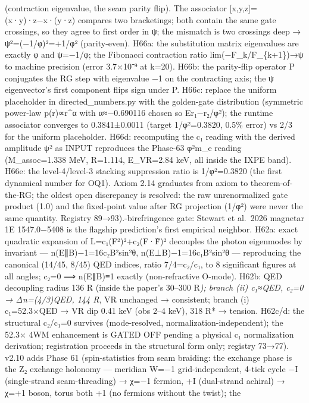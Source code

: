 \documentclass[
]{article}
\begin{document}
{(contraction eigenvalue, the seam parity flip). The associator
{[}x,y,z{]}=(x·y)·z−x·(y·z) compares two bracketings; both contain the
same gate crossings, so they agree to first order in ψ; the mismatch is
two crossings deep → ψ²=(−1/φ)²=+1/φ² (parity-even). H66a: the
substitution matrix eigenvalues are exactly φ and ψ=−1/φ; the Fibonacci
contraction ratio lim(−F\_k/F\_\{k+1\})→ψ to machine precision (error
3.7×10⁻⁹ at k=20). H66b: the parity-flip operator P conjugates the RG
step with eigenvalue −1 on the contracting axis; the ψ eigenvector's
first component flips sign under P. H66c: replace the uniform
placeholder in directed\_numbers.py with the golden-gate distribution
(symmetric power-law p(r)∝\textbar r\textbar\^{}α with α≈−0.690116
chosen so E\textbar r₁−r₂/φ²); the runtime associator
converges to 0.3841±0.0011 (target 1/φ²=0.3820, 0.5\% error) vs 2/3 for
the uniform placeholder. H66d: recomputing the c₁ reading with the
derived amplitude ψ² as INPUT reproduces the Phase-63 φ²m\_e reading
(M\_assoc=1.338 MeV, R=1.114, E\_VR=2.84 keV, all inside the IXPE band).
H66e: the level-4/level-3 stacking suppression ratio is 1/φ²=0.3820 (the
first dynamical number for OQ1). Axiom 2.14 graduates from axiom to
theorem-of-the-RG; the oldest open discrepancy is resolved: the raw
unrenormalized gate product (1.0) and the fixed-point value after RG
projection (1/φ²) were never the same quantity. Registry
89→93).-birefringence gate: Stewart et al.~2026 magnetar 1E 1547.0−5408
is the flagship prediction's first empirical neighbor. H62a: exact
quadratic expansion of L=c₁(F²)²+c₂(F·F̃)² decouples the photon
eigenmodes by invariant --- n(E∥B)−1=16c₂B²sin²θ, n(E⊥B)−1=16c₁B²sin²θ
--- reproducing the canonical (14/45, 8/45) QED indices, ratio
7/4=c₂/c₁, to 8 significant figures at all angles; c₂=0 ⟹ n(E∥B)≡1
exactly (non-refractive O-mode). H62b: QED decoupling radius 136 R}
(inside the paper's 30--300 R\emph{); branch (ii) c₁≈QED, c₂=0 →
\textbar Δn\textbar=(4/3)QED, 144 R}, VR unchanged → consistent; branch
(i) c₁=52.3×QED → VR dip 0.41 keV (obs 2--4 keV), 318 R* → tension.
H62c/d: the structural c₂/c₁=0 survives (mode-resolved,
normalization-independent); the 52.3× 4WM enhancement is GATED OFF
pending a physical c₁ normalization derivation; registration proceeds in
the structural form only; registry 73→77). v2.10 adds Phase 61
(spin-statistics from seam braiding: the exchange phase is the Z₂
exchange holonomy --- meridian W=−1 grid-independent, 4-tick cycle −I
(single-strand seam-threading) → χ=−1 fermion, +I (dual-strand achiral)
→ χ=+1 boson, torus both +1 (no fermions without the twist); the
\end{document}
